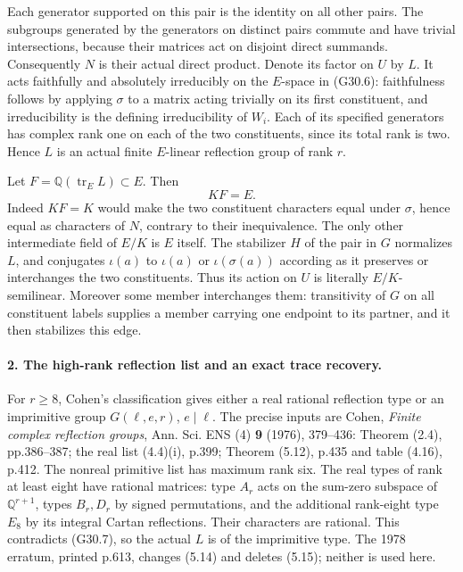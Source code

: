Each generator supported on this pair is the identity on
all other pairs. The subgroups generated by the generators
on distinct pairs commute and have trivial intersections,
because their matrices act on disjoint direct summands.
Consequently \(N\) is their actual direct product. Denote
its factor on \(U\) by \(L\). It acts faithfully and
absolutely irreducibly on the \(E\)-space in (G30.6):
faithfulness follows by applying \(\sigma\) to a matrix
acting trivially on its first constituent, and irreducibility
is the defining irreducibility of \(W_i\). Each of its
specified generators has complex rank one on each of the two
constituents, since its total rank is two. Hence \(L\)
is an actual finite \(E\)-linear reflection group of rank
\(r\).

Let \(F=\mathbb Q(\operatorname{tr}_E L)\subset E\).
Then
\[
                              KF=E.                         \tag{G30.7}
\]
Indeed \(KF=K\) would make the two constituent characters
equal under \(\sigma\), hence equal as characters of
\(N\), contrary to their inequivalence. The only other
intermediate field of \(E/K\) is \(E\) itself.
The stabilizer \(H\) of the pair in \(G\) normalizes
\(L\), and conjugates \(\iota(a)\) to \(\iota(a)\)
or \(\iota(\sigma(a))\) according as it preserves or
interchanges the two constituents. Thus its action on \(U\)
is literally \(E/K\)-semilinear. Moreover some member
interchanges them: transitivity of \(G\) on all constituent
labels supplies a member carrying one endpoint to its partner,
and it then stabilizes this edge.

\paragraph{2. The high-rank reflection list and an exact trace recovery.}
For \(r\ge8\), Cohen's classification gives either a
real rational reflection type or an imprimitive group
\(G(\ell,e,r)\), \(e\mid\ell\). The precise inputs
are Cohen, \emph{Finite complex reflection groups},
Ann. Sci. ENS (4) \textbf{9} (1976), 379--436:
Theorem (2.4), pp.386--387; the real list (4.4)(i), p.399;
Theorem (5.12), p.435 and table (4.16), p.412.
The nonreal primitive list has maximum rank six. The real
types of rank at least eight have rational matrices: type
\(A_r\) acts on the sum-zero subspace of \(\mathbb Q^{r+1}\),
types \(B_r,D_r\) by signed permutations, and the additional
rank-eight type \(E_8\) by its integral Cartan reflections.
Their characters are rational. This contradicts (G30.7),
so the actual \(L\) is of the imprimitive type.
The 1978 erratum, printed p.613, changes (5.14) and deletes
(5.15); neither is used here.

